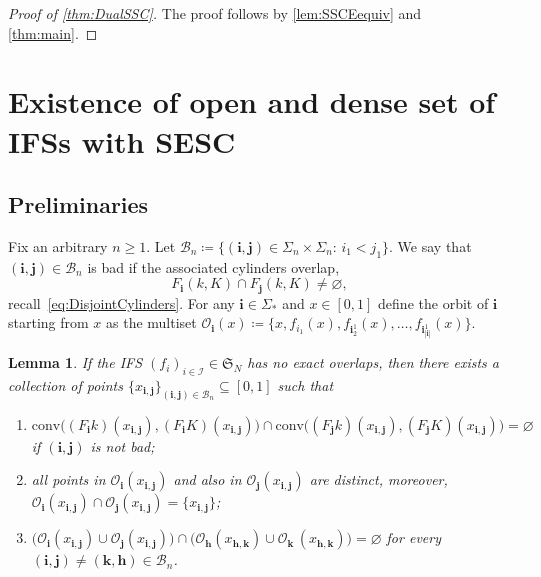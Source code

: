 \documentclass[11pt,]{article}
\def\cref#1{\ref{#1}}%
\newtheorem{lemma}[theorem]{Lemma}
\theoremstyle{definition}
\theoremstyle{remark}
\newcommand{\0}{\mathbf{0}}
\newcommand{\bi}{\mathbf{i}}
\newcommand{\bj}{\mathbf{j}}
\newcommand{\bk}{{\mathbf{k}}}
\newcommand{\bh}{{\mathbf{h}}}
\numberwithin{equation}{section}
\begin{document}
\begin{proof}[Proof of \cref{thm:DualSSC}]
	The proof follows by \cref{lem:SSCEequiv} and \cref{thm:main}.
\end{proof}

\section{Existence of open and dense set of IFSs with SESC}\label{sec:ProofESCOpenDense}

\subsection{Preliminaries}

Fix an arbitrary $n\geq 1$. Let $\mathcal{B}_n\coloneqq\{(\bi,\bj)\in\Sigma_n\times\Sigma_n:\,
i_1<j_1\}$. We say that $(\bi,\bj)\in\mathcal{B}_n$ is bad if the associated cylinders overlap,
\begin{equation}\label{eq:DefBad}
F_{\bi}(k,K)\cap F_{\bj}(k,K)\neq\varnothing,
\end{equation}
recall~\cref{eq:DisjointCylinders}. For any $\bi\in\Sigma_*$ and $x\in[0,1]$ define the orbit of
$\bi$ starting from $x$ as the multiset $\mathcal{O}_{\bi}(x)\coloneqq \{x,f_{i_1}(x),
f_{\bi_2^1}(x),\ldots,f_{\bi_{|\bi|}^1}(x)\}$. 


\begin{lemma}\label{lem:Pointsx_ij}
If the IFS $(f_i)_{i\in\mathcal{I}}\in\mathfrak{S}_N$ has no exact overlaps, then there exists a collection of points
$\{x_{\bi,\bj}\}_{(\bi,\bj)\in\mathcal{B}_n}\subseteq[0,1]$ such that
\begin{enumerate}[label=(\alph*)]
  \item\label{it:lla} $\mathrm{conv}\big((F_{\bi}k)(x_{\bi,\bj}), (F_{\bi}K)(x_{\bi,\bj})\big) \cap
  \mathrm{conv}\big((F_{\bj}k)(x_{\bi,\bj}),
	(F_{\bj}K)(x_{\bi,\bj})\big)= \varnothing$ if $(\bi,\bj)$ is not bad;  
      \item\label{it:llb} all points in $\mathcal{O}_{\bi}(x_{\bi,\bj})$ and also in $\mathcal{O}_{\bj}(x_{\bi,\bj})$
  are distinct, moreover,
  $\mathcal{O}_{\bi}(x_{\bi,\bj})\cap\mathcal{O}_{\bj}(x_{\bi,\bj})=\{x_{\bi,\bj}\}$;
\item\label{it:llc} $\big(\mathcal{O}_{\bi}(x_{\bi,\bj})\cup \mathcal{O}_{\bj}(x_{\bi,\bj})\big) \cap
  \big(\mathcal{O}_{\bh}(x_{\bh,\bk})\cup
  \mathcal{O}_{\bk}\,(x_{\bh,\bk})\big)=\varnothing$ for every $(\bi,\bj)\neq
  (\bk,\bh)\in\mathcal{B}_n$.
\end{enumerate} 
\end{lemma}
\end{document}
